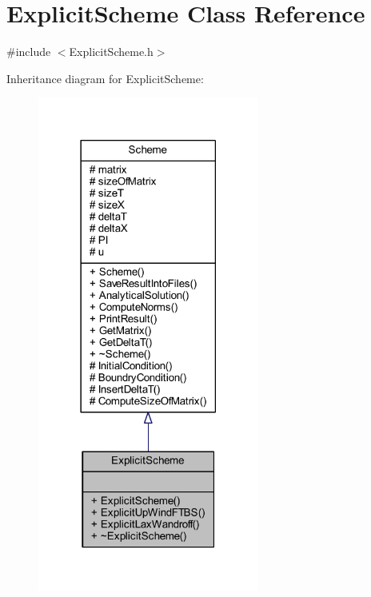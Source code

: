 \hypertarget{class_explicit_scheme}{}\section{Explicit\+Scheme Class Reference}
\label{class_explicit_scheme}


{\ttfamily \#include $<$Explicit\+Scheme.\+h$>$}



Inheritance diagram for Explicit\+Scheme\+:\nopagebreak
\begin{figure}[H]
\begin{center}
\leavevmode
\includegraphics[width=206pt]{class_explicit_scheme__inherit__graph}
\end{center}
\end{figure}


